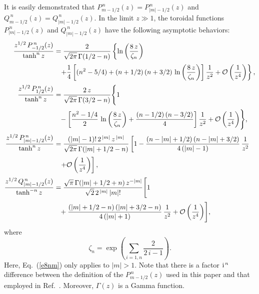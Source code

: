 \documentclass[12pt,prb,aps]{revtex4-1}
\begin{document}
It is easily demonstrated that $P_{m-1/2}^{\,n}(z)= P_{|m|-1/2}^{\,n}(z)$
and $Q_{m-1/2}^{\,n}(z) = Q_{|m|-1/2}^{\,n}(z)$.\cite{abram2}
In the limit $z\gg 1$, the toroidal functions $P_{|m|-1/2}^{\,n}(z)$ and $Q_{|m|-1/2}^{\,n}(z)$
have the following asymptotic behaviors:\,\cite{morse2,bate}
\begin{align}
\frac{z^{1/2}\,P_{-1/2}^{\,n}(z)}{\tanh^{n}z}&= \frac{2}{\sqrt{2\pi}\,\Gamma(1/2-n)}
\left\{\ln\left(\frac{8\,z}{\zeta_n}\right)\right.\nonumber\\[0.5ex]
&\phantom{=}\left.
+ \frac{1}{4}\left[(n^2-5/4)+ (n+1/2)\,(n+3/2)\,\ln\left(\frac{8\,z}{\zeta_n}\right)\right]\frac{1}{z^2}+{\cal O}\left(\frac{1}{z^4}\right)\right\},\\[0.5ex]
\frac{z^{1/2}\,P_{1/2}^{\,n}(z)}{\tanh^n z}&= \frac{2\,z}{\sqrt{2\pi}\,\Gamma(3/2-n)}
\Biggl\{1\nonumber\\[0.5ex]&\phantom{=}-\left[\frac{n^2-1/4}{2}\,\ln\left(\frac{8\,z}{\zeta_n}\right)+\frac{(n-1/2)\,(n-3/2)}{4} \right]\frac{1}{z^2}+{\cal O}\left(\frac{1}{z^4}\right)\Biggr\},\\[0.5ex]
\frac{z^{1/2}\,P_{|m|-1/2}^{\,n}(z)}{\tanh^n z}&= \frac{(|m|-1)!\,2^{\,|m|}\,z^{\,|m|}}{\sqrt{2\pi}\,\Gamma(|m|+1/2-n)}
\left[1- \frac{(n-|m|+1/2)\,(n-|m|+3/2)}{4\,(|m|-1)}\,\frac{1}{z^2}\right.\nonumber\\[0.5ex]&\phantom{=}\left.+{\cal O}\left(\frac{1}{z^4}\right)\right],\label{e8nm}\\[0.5ex]
\frac{z^{1/2}\,Q_{|m|-1/2}^{\,n}(z)}{\tanh^{-n}z}&=  \frac{\sqrt{\pi}\,\Gamma(|m|+1/2+n)\,z^{-|m|}}{\sqrt{2}\,2^{\,|m|}\,|m|!}
\Biggl[1\nonumber\\[0.5ex]&\phantom{=}+ \frac{(|m|+1/2-n)\,(|m|+3/2-n)}{4\,(|m|+1)}\,\frac{1}{z^2}+{\cal O}\left(\frac{1}{z^4}\right)\Biggr],\label{e241}
\end{align}
where
\begin{equation}
\zeta_n = \exp\left(\sum_{i=1,n}\frac{2}{2\,i-1}\right).
\end{equation}
Here, Eq.~(\ref{e8nm}) only applies to $|m|>1$. 
Note that there is a factor ${\rm i}^{\,n}$ difference between the definition of the $P_{m-1/2}^{\,n}(z)$ used in this paper and that employed in Ref.~.
Moreover, $\Gamma(z)$ is a Gamma function.\cite{abram1} 
\end{document}
